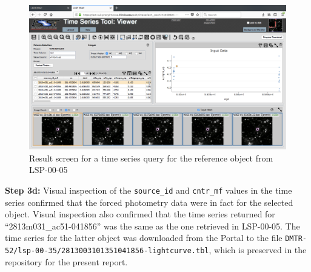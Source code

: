 \begin{figure}
  \includegraphics[width=\linewidth]{lsp-00-35/ref05-timeSeries.png}
  \caption{Result screen for a time series query for the reference object from LSP-00-05}
  \label{fig:lsp-00-35-time-series-ref05}
\end{figure}

\textbf{Step 3d:} Visual inspection of the \verb|source_id| and \verb|cntr_mf| values in the time series confirmed that the forced photometry data were in fact for the selected object.
Visual inspection also confirmed that the time series returned for ``2813m031\_ac51-041856'' was the same as the one retrieved in LSP-00-05.
The time series for the latter object was downloaded from the Portal to the file
\verb|DMTR-52/lsp-00-35/2813003101351041856-lightcurve.tbl|,
which is preserved in the repository for the present report.

